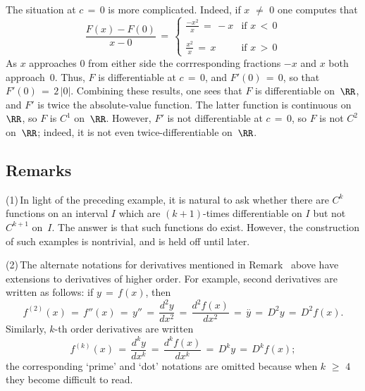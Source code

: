        The situation at $c \,=\, 0$ is more complicated. Indeed, if $x \,\,{\neq}\,\, 0$ one computes that
        \begin{displaymath}
        \frac{F(x)-F(0)}{x-0} \,=\, \left\{
        \begin{array}{cl}
        {\displaystyle \frac{-x^{2}}{x} \,=\, -x} & \mbox{if $x\,<\,0$} \\
                                                      &                     \\
        {\displaystyle \frac{x^{2}}{x} \,=\, x}   & \mbox{if $x\,>\,0$}
        \end{array}
                                                \right.
        \end{displaymath}
    As $x$ approaches $0$ from either side the corrresponding fractions $-x$ and $x$ both approach~$0$.
    Thus, $F$ is differentiable at $c \,=\, 0$, and $F'(0) \,=\, 0$, so that $F'(0) \,=\, 2\,|0|$. Combining these results,
    one sees that $F$ is differentiable on~${\RR}$, and $F'$ is twice the absolute-value function.
    The latter function is continuous on ${\RR}$, so $F$ is $C^{1}$ on~${\RR}$. However, $F'$ is not differentiable at $c \,=\, 0$,
    so $F$ is not $C^{2}$ on~${\RR}$; indeed, it is not even twice-differentiable on~${\RR}$.

\VV

            \subsection{\small{\bf Remarks}}
            \label{RemrkE20.87}

\V

 (1)\,In light of the preceding example, it is natural to ask whether there are $C^{k}$ functions on an interval $I$ which are $(k+1)$-times differentiable on $I$ but not $C^{k+1}$ on~$I$.
    The answer is that such functions do exist. However, the construction of such examples is nontrivial, and is held off until later.

\V

        (2)\,The alternate notations for derivatives mentioned in Remark~ above
    have extensions to derivatives of higher order.
    For example, second derivatives are written as follows: if $y \,=\, f(x)$, then
        \begin{displaymath}
        f^{(2)}(x) \,=\, f''(x) \,=\, y'' \,=\, \frac{d^{2}y}{dx^{2}} \,=\, \frac{d^{2}f(x)}{dx^{2}} \,=\,  \stackrel{..}{y} \,=\, D^{2}y \,=\, D^{2}f(x).
        \end{displaymath}
    Similarly, $k$-th order derivatives are written
        \begin{displaymath}
        f^{(k)}(x) \,=\, \frac{d^{k}y}{dx^{k}} \,=\, \frac{d^{k}f(x)}{dx^{k}} \,=\,  D^{k}y \,=\, D^{k}f(x);
        \end{displaymath}
    the corresponding `prime' and `dot' notations are omitted because when $k\,\,{\geq}\,\,4$ they become difficult to read.

